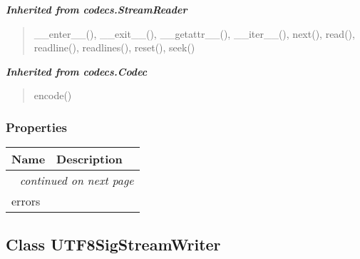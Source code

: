 \large{\textbf{\textit{Inherited from codecs.StreamReader}}}

\begin{quote}
\_\_enter\_\_(), \_\_exit\_\_(), \_\_getattr\_\_(), \_\_iter\_\_(), next(), read(), readline(), readlines(), reset(), seek()
\end{quote}

\large{\textbf{\textit{Inherited from codecs.Codec}}}

\begin{quote}
encode()
\end{quote}


  \subsubsection{Properties}

    \vspace{-1cm}
\hspace{\varindent}\begin{longtable}{|p{\varnamewidth}|p{\vardescrwidth}|l}
\cline{1-2}
\cline{1-2} \centering \textbf{Name} & \centering \textbf{Description}& \\
\cline{1-2}
\endhead\cline{1-2}\multicolumn{3}{r}{\small\textit{continued on next page}}\\\endfoot\cline{1-2}
\endlastfoot\raggedright e\-r\-r\-o\-r\-s\- & &\\
\cline{1-2}
\end{longtable}



\subsection{Class UTF8SigStreamWriter}

